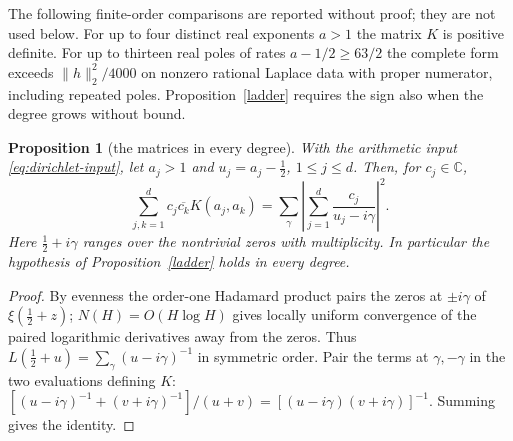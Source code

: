 \documentclass[10pt]{amsart}
\newtheorem{proposition}[theorem]{Proposition}
\theoremstyle{definition}
\theoremstyle{remark}
\newcommand{\anThmA}{\ref{thm:srcA}}\newcommand{\anThmB}{\ref{thm:srcB}}\newcommand{\anThmC}{\ref{thm:srcC}}
\begin{document}
The following finite-order comparisons are reported without proof; they are not used below. For up to four distinct real exponents $a>1$ the matrix $K$ is positive
definite. For up to thirteen real poles of rates
$a-1/2\ge63/2$ the complete form exceeds $\|h\|_2^2/4000$ on nonzero
rational Laplace data with proper numerator, including repeated poles. Proposition~\ref{ladder} requires the sign also
when the degree grows without bound.

\begin{proposition}[the matrices in every degree]\label{prop:all-degree-gram}
With the arithmetic input \eqref{eq:dirichlet-input}, let $a_j>1$
and $u_j=a_j-\tfrac12$, $1\le j\le d$. Then, for $c_j\in\mathbb C$,
\[
 \sum_{j,k=1}^d c_j\overline{c_k}K(a_j,a_k)
 =\sum_{\gamma}\left|\sum_{j=1}^d\frac{c_j}{u_j-i\gamma}\right|^2 .
\]
Here $\tfrac12+i\gamma$ ranges over the nontrivial zeros with multiplicity.
In particular the hypothesis of Proposition~\ref{ladder} holds in every degree.
\end{proposition}
\begin{proof}
By evenness the order-one Hadamard product pairs the zeros at $\pm i\gamma$
of $\xi(\tfrac12+z)$; $N(H)=O(H\log H)$ gives locally uniform convergence
of the paired logarithmic derivatives away from the zeros. Thus
$L(\tfrac12+u)=\sum_\gamma(u-i\gamma)^{-1}$ in symmetric order.
Pair the terms at $\gamma,-\gamma$ in the two evaluations defining $K$:
$[(u-i\gamma)^{-1}+(v+i\gamma)^{-1}]/(u+v)
=[(u-i\gamma)(v+i\gamma)]^{-1}$. Summing gives the identity.
\end{proof}

\providecommand{\anThmA}{\ref{thm:A}}
\providecommand{\anThmB}{\ref{thm:B}}
\providecommand{\anThmC}{\ref{thm:C}}
\providecommand{\anchi}{\chi_K}
\providecommand{\anLam}{\Lambda_K}
\providecommand{\anlam}{\lambda}
\providecommand{\aneu}{\mathrm{eu}_d}
\providecommand{\anord}{\operatorname{ord}}
\providecommand{\anF}{\mathcal F}
\providecommand{\anPl}{\Phi}
\providecommand{\anPa}{\Phi_a}
\providecommand{\anPb}{\Phi_b}
\providecommand{\ancl}{\mathrm{cl}}
\providecommand{\anrd}{\mathrm{rd}}
\providecommand{\anrem}{\operatorname{rem}}
\providecommand{\anhm}{h_{\mathrm{main}}}
\providecommand{\anhd}{h_{\mathrm{dir}}}
\providecommand{\ansf}{s_{\mathrm{fin}}}
\providecommand{\ansm}{s_{\mathrm{main}}}
\providecommand{\ansi}{s_{\infty}}
\providecommand{\andT}{d_{\mathcal T}}
\providecommand{\anCP}{C_P}
\providecommand{\ancE}{\mathcal E}
\end{document}
